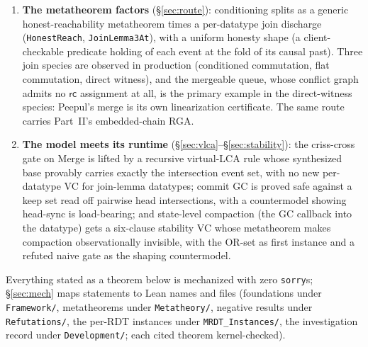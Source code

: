 \documentclass[11pt]{article}
\newcommand{\rcrel}{\mathsf{rc}}                 %
\newcommand{\lean}[1]{\texttt{#1}}
\begin{document}
\begin{enumerate}[leftmargin=2em]
  OR-set, an optimized OR-set, enable-wins flag, grow-only set and map,
  increment-only and PN counters, a tombstone RGA, Peritext, the
  multi-valued register and the add-wins priority queue --- are
  discharged end-to-end, kernel-checked; the sequence data types with
  physical deletion go through the conditioned framework and its
  factored discharge route (\S\ref{sec:condmeta}--\S\ref{sec:route},
  Part~II). The sweep produces an empirical
  \emph{class map} of which data types need which strength of contract,
  with two findings: tombstones simplify the metatheory, and
  commutativity class and delta class are independent axes.
\item \textbf{The metatheorem factors} (\S\ref{sec:route}): conditioning
  splits as a generic honest-reachability metatheorem times a
  per-datatype join discharge (\lean{HonestReach},
  \lean{JoinLemma3At}), with a uniform honesty shape (a client-checkable
  predicate holding of each event at the fold of its causal past). Three
  join species are observed in production (conditioned commutation, flat
  commutation, direct witness), and the mergeable queue, whose conflict
  graph admits no $\rcrel$ assignment at all, is the primary example in the
  direct-witness species: Peepul's merge is its own linearization
  certificate. The same route carries Part~II's embedded-chain RGA.
\item \textbf{The model meets its runtime}
  (\S\ref{sec:vlca}--\S\ref{sec:stability}): the criss-cross gate on
  Merge is lifted by a recursive virtual-LCA rule whose synthesized base
  provably carries exactly the intersection event set, with no new
  per-datatype VC for join-lemma datatypes; commit GC is proved safe
  against a keep set read off pairwise head intersections, with a
  countermodel showing head-sync is load-bearing; and state-level
  compaction (the GC callback into the datatype) gets a six-clause
  stability VC whose metatheorem makes compaction observationally
  invisible, with the OR-set as first instance and a refuted naive gate
  as the shaping countermodel.
\end{enumerate}

Everything stated as a theorem below is mechanized with zero
\lean{sorry}s; \S\ref{sec:mech} maps statements to Lean names and files
(foundations under \lean{Framework/}, metatheorems under
\lean{Metatheory/}, negative results under \lean{Refutations/}, the
per-RDT instances under \lean{MRDT\_Instances/}, the investigation record
under \lean{Development/}; each cited theorem kernel-checked).
\end{document}
